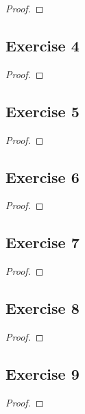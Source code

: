 \documentclass[14pt]{extarticle}
\begin{document}
\begin{proof}

\end{proof}

\subsection{Exercise 4}

\begin{proof}

\end{proof}

\subsection{Exercise 5}

\begin{proof}

\end{proof}

\subsection{Exercise 6}

\begin{proof}

\end{proof}

\subsection{Exercise 7}

\begin{proof}

\end{proof}

\subsection{Exercise 8}

\begin{proof}

\end{proof}

\subsection{Exercise 9}

\begin{proof}

\end{proof}
\end{document}
